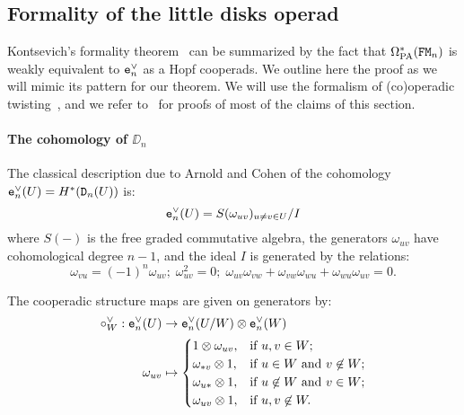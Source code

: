 \subsection{Formality of the little disks operad}
\label{cnf.sec.formality}

Kontsevich's formality theorem~\cite{Kontsevich1999,LambrechtsVolic2014} can be summarized by the fact that $\Omega_{\mathrm{PA}}^{*}(\mathtt{FM}_{n})$ is weakly equivalent to $\mathtt{e}_{n}^{\vee}$ as a Hopf cooperads.
We outline here the proof as we will mimic its pattern for our theorem.
We will use the formalism of (co)operadic twisting~\cite{Willwacher2014,DolgushevWillwacher2015}, and we refer to~\cite{LambrechtsVolic2014} for proofs of most of the claims of this section.

\paragraph{The cohomology of $\DD_{n}$}

The classical description due to Arnold and Cohen of the cohomology $\mathtt{e}_{n}^{\vee}(U) = H^{*}(\mathtt{D}_{n}(U))$ is:
\begin{equation}
  \label{cnf.eq.def-enV}
  \mathtt{e}_{n}^{\vee}(U) = S(\omega_{uv})_{u \neq v \in U} / I
\end{equation}
where $S(-)$ is the free graded commutative algebra, the generators $\omega_{uv}$ have cohomological degree $n-1$, and the ideal $I$ is generated by the relations:
\begin{equation}
  \label{cnf.eq:5}
  \omega_{vu} = (-1)^{n} \omega_{uv}; \; \omega_{uv}^{2} = 0; \; \omega_{uv} \omega_{vw} + \omega_{vw} \omega_{wu} + \omega_{wu} \omega_{uv} = 0.
\end{equation}

The cooperadic structure maps are given on generators by:
\begin{align}
  \circ^{\vee}_{W} : \mathtt{e}_{n}^{\vee}(U)
  & \to \mathtt{e}_{n}^{\vee}(U/W) \otimes \mathtt{e}_{n}^{\vee}(W)
  \notag \\
  \omega_{uv}
  & \mapsto
  \begin{cases}
    1 \otimes \omega_{uv}, & \text{if } u,v \in W; \\
    \omega_{*v} \otimes 1, & \text{if } u \in W \text{ and } v \not\in W; \\
    \omega_{u*} \otimes 1, & \text{if } u \not\in W \text{ and } v \in W; \\
    \omega_{uv} \otimes 1, & \text{if } u, v \not\in W.
  \end{cases}
  \label{cnf.eq.coop-gra-n}
\end{align}

